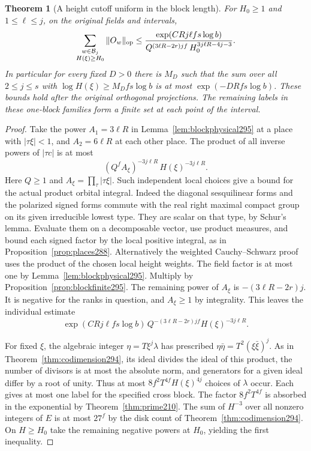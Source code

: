 \documentclass[a4paper,11pt]{article}
\newtheorem{theorem}[proposition]{Theorem}
\theoremstyle{definition}
\theoremstyle{remark}
\numberwithin{equation}{section}
\begin{document}
\begin{theorem}[A height cutoff uniform in the block length]\leavevmode
\label{thm:blocktail295}
For \(H_0\ge1\) and \(1\le\ell\le j\), on the original
fields and intervals,
\[
   \sum_{\substack{w\in\mathcal B_j\\H(\xi)\ge H_0}}
        \|O_w\|_{\rm op}
   \le \frac{\exp(CRj\ell f s\log b)}
               {Q^{(3\ell R-2r)jf}\,H_0^{3j\ell R-4j-3}} .
\]
In particular for every fixed \(D>0\) there is \(M_D\)
such that the sum over all \(2\le j\le s\) with
\(\log H(\xi)\ge M_D f s\log b\) is at most
\(\exp(-D R f s\log b)\). These bounds hold after the
original orthogonal projections. The remaining labels
in these one-block families form a finite set at each
point of the interval.
\end{theorem}
\begin{proof}
Take the power \(A_1=3\ell R\) in Lemma~\ref{lem:blockphysical295}
at a place with \(|\tau\xi|<1\), and \(A_2=6\ell R\) at
each other place. The product of all inverse powers of
\(|\tau c|\) is at most
\[
       (Q^f A_\xi)^{-3j\ell R}\,H(\xi)^{-3j\ell R}.
\]
Here \(Q\ge1\) and \(A_\xi=\prod_\tau|\tau\xi|\).
Such independent local choices give a bound for the
actual product orbital integral. Indeed the diagonal
sesquilinear forms and the polarized signed forms
commute with the real right maximal compact group on
its given irreducible lowest type. They are scalar
on that type, by Schur's lemma. Evaluate them on a
decomposable vector, use product measures, and bound
each signed factor by the local positive integral, as
in Proposition~\ref{prop:places288}. Alternatively the
weighted Cauchy--Schwarz proof uses the product of the
chosen local height weights. The field factor is at
most one by Lemma~\ref{lem:blockphysical295}.
Multiply by Proposition~\ref{prop:blockfinite295}.
The remaining power of \(A_\xi\) is \(-(3\ell R-2r)j\).
It is negative for the ranks in question, and \(A_\xi\ge1\)
by integrality. This leaves the individual estimate
\[
   \exp(CRj\ell f s\log b)\,
           Q^{-(3\ell R-2r)jf}H(\xi)^{-3j\ell R}.
\]

For fixed \(\xi\), the algebraic integer
\(\eta=T\xi^j\lambda\) has prescribed
\(\eta\bar\eta=T^2(\xi\bar\xi)^j\).
As in Theorem~\ref{thm:codimension294}, its ideal divides
the ideal of this product, the number of divisors is at
most the absolute norm, and generators for a given ideal
differ by a root of unity. Thus at most
\(8f^2 T^{4f} H(\xi)^{4j}\) choices of \(\lambda\)
occur. Each gives at most one label for the specified
cross block. The factor \(8f^2 T^{4f}\) is absorbed in
the exponential by Theorem~\ref{thm:prime210}.
The sum of \(H^{-3}\) over all nonzero integers of \(E\)
is at most \(27^f\) by the disk count of
Theorem~\ref{thm:codimension294}. On \(H\ge H_0\) take
the remaining negative powers at \(H_0\), yielding the
first inequality.


\end{proof}
\end{document}
